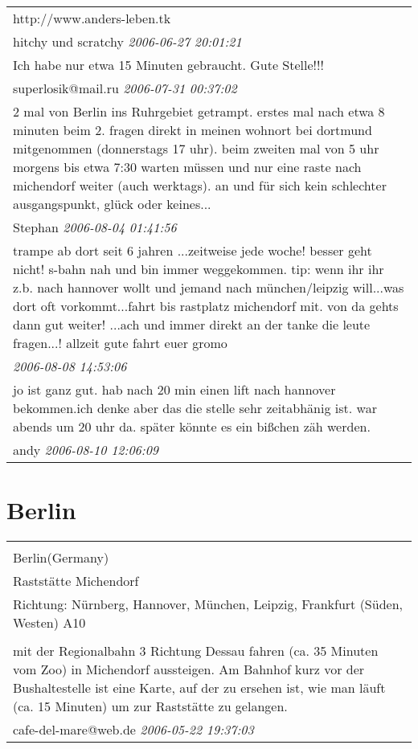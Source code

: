 \documentclass[a4paper,12pt]{article}
\begin{document}
\begin{tabular}{|p{13cm}|}
http://www.anders-leben.tk \\
hitchy und scratchy \textit{ 2006-06-27 20:01:21 }\\\hline Ich habe nur etwa 15 Minuten gebraucht. Gute Stelle!!! \\
superlosik@mail.ru \textit{ 2006-07-31 00:37:02 }\\\hline 2 mal von Berlin ins Ruhrgebiet getrampt.
erstes mal nach etwa 8 minuten beim 2. fragen direkt in meinen wohnort bei dortmund mitgenommen (donnerstags 17 uhr).
beim zweiten mal von 5 uhr morgens bis etwa 7:30 warten müssen und nur eine raste nach michendorf weiter (auch werktags). an und für sich kein schlechter ausgangspunkt, glück oder keines... \\
Stephan \textit{ 2006-08-04 01:41:56 }\\\hline trampe ab dort seit 6 jahren ...zeitweise jede woche! besser geht nicht! s-bahn nah und bin immer weggekommen.
tip: wenn ihr ihr z.b. nach hannover wollt und jemand nach münchen/leipzig will...was dort oft vorkommt...fahrt bis rastplatz michendorf mit. von da gehts dann gut weiter!
...ach und immer direkt an der tanke die leute fragen...!
allzeit gute fahrt
euer gromo \\
\textit{ 2006-08-08 14:53:06 }\\\hline jo ist ganz gut. hab nach 20 min einen lift nach hannover bekommen.ich denke aber das die stelle sehr zeitabhänig ist. war abends um 20 uhr da. später könnte es ein bißchen zäh werden. \\
andy \textit{ 2006-08-10 12:06:09 }\\\hline
\end{tabular}


\section{Berlin}
\begin{tabular}{|p{13cm}|}
\hline\\
Berlin(Germany)\\
Raststätte Michendorf\\
Richtung: Nürnberg, Hannover, München, Leipzig, Frankfurt (Süden, Westen) A10 \\
\hline\\
mit der Regionalbahn 3 Richtung Dessau fahren (ca. 35 Minuten vom Zoo) in Michendorf aussteigen. Am Bahnhof kurz vor der Bushaltestelle ist eine Karte, auf der zu ersehen ist, wie man läuft (ca. 15 Minuten) um zur Raststätte zu gelangen. \\
cafe-del-mare@web.de \textit{ 2006-05-22 19:37:03 }\\\hline
\end{tabular}
\end{document}
